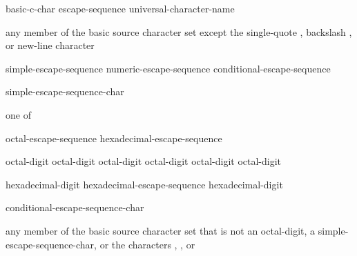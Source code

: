 \begin{bnf}
\br
    basic-c-char\br
    escape-sequence\br
    universal-character-name
\end{bnf}

\begin{bnf}
\br
    \textnormal{any member of the basic source character set except the single-quote , backslash \terminal{\textbackslash}, or new-line character}
\end{bnf}

\begin{bnf}
\br
    simple-escape-sequence\br
    numeric-escape-sequence\br
    conditional-escape-sequence
\end{bnf}

\begin{bnf}
\br
    \terminal{\textbackslash} simple-escape-sequence-char
\end{bnf}

\begin{bnf}
 \textnormal{one of}\br
\end{bnf}

\begin{bnf}
\br
    octal-escape-sequence\br
    hexadecimal-escape-sequence
\end{bnf}

\begin{bnf}
\br
    \literalterminal{\textbackslash} octal-digit\br
    \literalterminal{\textbackslash} octal-digit octal-digit\br
    \literalterminal{\textbackslash} octal-digit octal-digit octal-digit
\end{bnf}

\begin{bnf}
\br
     hexadecimal-digit\br
    hexadecimal-escape-sequence hexadecimal-digit
\end{bnf}

\begin{bnf}
\br
    \terminal{\textbackslash} conditional-escape-sequence-char
\end{bnf}

\begin{bnf}
\br
    \textnormal{any member of the basic source character set that is not an} octal-digit\textnormal{, a} simple-escape-sequence-char\textnormal{, or the characters , , or }
\end{bnf}

